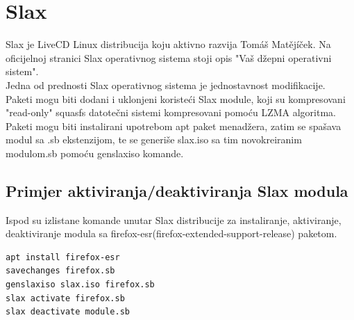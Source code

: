 \documentclass[12pt,vi]{mitthesis}
\begin{document}
\section*{Slax}
\indent
Slax je LiveCD Linux distribucija koju aktivno razvija Tomáš Matějíček. Na oficijelnoj stranici Slax operativnog sistema stoji opis "Vaš džepni operativni sistem".\\
\indent
Jedna od prednosti Slax operativnog sistema je jednostavnost modifikacije. Paketi mogu biti dodani i uklonjeni koristeći Slax module, koji su kompresovani "read-only" squasfs datotečni sistemi kompresovani pomoću LZMA algoritma.\\
Paketi mogu biti instalirani upotrebom apt paket menadžera, zatim se spašava modul sa .sb ekstenzijom, te se generiše slax.iso sa tim novokreiranim modulom.sb pomoću genslaxiso komande.\\
\subsection*{Primjer aktiviranja/deaktiviranja Slax modula}
\indent
Ispod su izlistane komande unutar Slax distribucije za instaliranje, aktiviranje, deaktiviranje modula sa firefox-esr(firefox-extended-support-release) paketom.
\begin{lstlisting}[style=BashInputStyle]
apt install firefox-esr
savechanges firefox.sb
genslaxiso slax.iso firefox.sb
slax activate firefox.sb
slax deactivate module.sb
\end{lstlisting}
\end{document}
